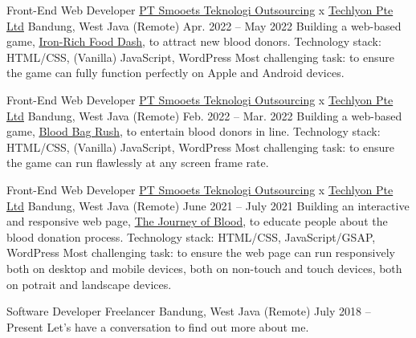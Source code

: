 \begin{cventries}
\cventry
{Front-End Web Developer} %
{\href{https://www.smooets.com/}{PT Smooets Teknologi Outsourcing} x \href{https://helloakin.com/}{Techlyon Pte Ltd}} %
{Bandung, West Java (Remote)} %
{Apr. 2022 -- May 2022} %
{ %
Building a web-based game, \href{https://giveblood.sg/iron-rich-food/}{Iron-Rich Food Dash}, to attract new blood donors.
\linebreak
Technology stack: HTML/CSS, (Vanilla) JavaScript, WordPress
\linebreak
Most challenging task: to ensure the game can fully function perfectly on Apple and Android devices.
}

\cventry
{Front-End Web Developer} %
{\href{https://www.smooets.com/}{PT Smooets Teknologi Outsourcing} x \href{https://helloakin.com/}{Techlyon Pte Ltd}} %
{Bandung, West Java (Remote)} %
{Feb. 2022 -- Mar. 2022} %
{ %
Building a web-based game, \href{https://giveblood.sg/blood-bag-rush/}{Blood Bag Rush}, to entertain blood donors in line.
\linebreak
Technology stack: HTML/CSS, (Vanilla) JavaScript, WordPress
\linebreak
Most challenging task: to ensure the game can run flawlessly at any screen frame rate.
}

\cventry
{Front-End Web Developer} %
{\href{https://www.smooets.com/}{PT Smooets Teknologi Outsourcing} x \href{https://helloakin.com/}{Techlyon Pte Ltd}} %
{Bandung, West Java (Remote)} %
{June 2021 -- July 2021} %
{ %
Building an interactive and responsive web page, \href{https://giveblood.sg/discover/}{The Journey of Blood}, to educate people about the blood donation process.
\linebreak
Technology stack: HTML/CSS, JavaScript/GSAP, WordPress
\linebreak
Most challenging task: to ensure the web page can run responsively both on desktop and mobile devices, both on non-touch and touch devices, both on potrait and landscape devices.
}


\cventry
{Software Developer} %
{Freelancer} %
{Bandung, West Java (Remote)} %
{July 2018 -- Present} %
{ %
Let's have a conversation to find out more about me.
}


\end{cventries}
